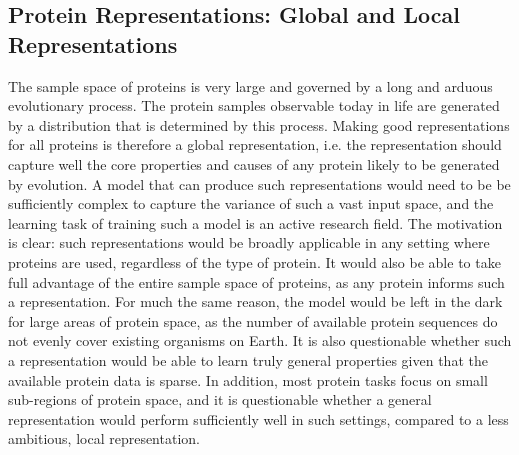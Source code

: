 \subsection{Protein Representations: Global and Local Representations}
The sample space of proteins is very large and governed by a long and arduous evolutionary process. The protein samples observable today in life are generated by a distribution that is determined by this process. Making good representations for all proteins is therefore a global representation, i.e. the representation should capture well the core properties and causes of any protein likely to be generated by evolution. A model that can produce such representations would need to be be sufficiently complex to capture the variance of such a vast input space, and the learning task of training such a model is an active research field. The motivation is clear: such representations would be broadly applicable in any setting where proteins are used, regardless of the type of protein. It would also be able to take full advantage of the entire sample space of proteins, as any protein informs such a representation. For much the same reason, the model would be left in the dark for large areas of protein space, as the number of available protein sequences do not evenly cover existing organisms on Earth. It is also questionable whether such a representation would be able to learn truly general properties given that the available protein data is sparse. In addition, most protein tasks focus on small sub-regions of protein space, and it is questionable whether a general representation would perform sufficiently well in such settings, compared to a less ambitious, local representation. 

